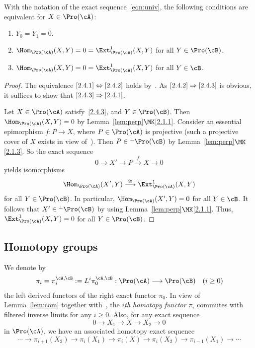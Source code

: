 \begin{lemm}\label{lem:sc}
With the notation of the exact sequence~\eqref{eqn:univ}, the following conditions are equivalent for $X \in \Pro(\cA)$:
\begin{enumerate}\romanenumi
\item \label{2.4.1} $Y_0 = Y_1 = 0$.
\item \label{2.4.2} $\Hom_{\Pro(\cA)}(X,Y) = 0 = \Ext^1_{\Pro(\cA)}(X,Y)$ for all $Y \in \Pro(\cB)$.
\item \label{2.4.3} $\Hom_{\Pro(\cA)}(X,Y) = 0 = \Ext^1_{\Pro(\cA)}(X,Y)$ for all $Y \in \cB$.
\end{enumerate}
\end{lemm}

\begin{proof}
The equivalence $\eqref{2.4.1}\Leftrightarrow\eqref{2.4.2}$ holds by~\cite[III.2.Cor.]{Gabriel}. As $\eqref{2.4.2}\Rightarrow\eqref{2.4.3}$ is obvious, it suffices to show that $\eqref{2.4.3}\Rightarrow\eqref{2.4.1}$.

Let $X \in \Pro(\cA)$ satisfy~\eqref{2.4.3}, and $Y \in \Pro(\cB)$. Then $\Hom_{\Pro(\cA)}(X,Y) = 0$ by Lemma~\ref{lem:perp}$\MK$\eqref{2.1.1}. Consider an essential epimorphism $f: P \to X$, where $P \in \Pro(\cA)$ is projective (such a projective cover of $X$ exists in view of~\cite[II.6.Thm.~2]{Gabriel}). Then $P \in {^{\perp}\Pro(\cB)}$ by Lemma~\ref{lem:perp}$\MK$\eqref{2.1.3}. So the exact sequence
\[
0 \longrightarrow X' \longrightarrow P
\stackrel{f}{\longrightarrow} X
\longrightarrow 0
\]
yields isomorphisms
\begin{equation}\label{eqn:dec}
\Hom_{\Pro(\cA)}(X',Y) \stackrel{\cong}{\longrightarrow}
\Ext^1_{\Pro(\cA)}(X,Y)
\end{equation}
for all $Y \in \Pro(\cB)$. In particular, $\Hom_{\Pro(\cA)}(X',Y) = 0$ for all $Y \in \cB$. It follows that $X' \in {^{\perp}\Pro(\cB)} $ by using Lemma~\ref{lem:perp}$\MK$\eqref{2.1.1}. Thus, $\Ext^1_{\Pro(\cA)}(X,Y) = 0$ for all $Y \in \Pro(\cB)$.
\end{proof}

\subsection{Homotopy groups}\label{subsec:homotopy}

We denote by
\[
\pi_i = \pi_i^{\cA, \cB} := L^i \pi_0^{\cA,\cB} :
\Pro(\cA) \longrightarrow \Pro(\cB) \quad (i \geq 0)
\]
the left derived functors of the right exact functor $\pi_0$. In view of Lemma~\ref{lem:com} together with~\cite[V.2.3.8]{DG}, the \emph{$i$th homotopy functor} $\pi_i$ commutes with filtered inverse limits for any $i \geq 0$. Also, for any exact sequence
\[
0 \longrightarrow X_1 \longrightarrow X
\longrightarrow X_2 \longrightarrow 0
\]
in $\Pro(\cA)$, we have an associated homotopy exact sequence
\begin{equation}\label{eqn:homotopy}
\cdots \to \pi_{i+1}(X_2) \to \pi_i(X_1) \to
\pi_i(X) \to \pi_i(X_2) \to \pi_{i-1}(X_1) \to \cdots
\end{equation}

